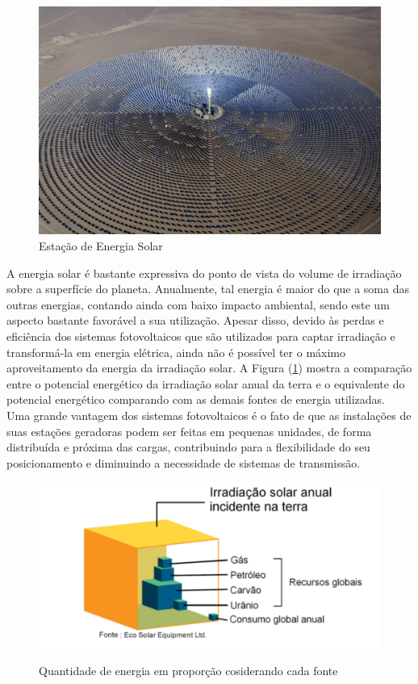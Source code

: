 \documentclass[11pt, a4paper, oneside]{article}
\begin{document}
\begin{figure}[h!]
\centering
\includegraphics[width=1\linewidth]{fonte_solar}
\caption{Estação de Energia Solar \cite{fonte_solar}}
\end{figure}

A energia solar é bastante expressiva do ponto de vista do volume de
irradiação sobre a superfície do planeta. Anualmente, tal energia é maior do que a
soma das outras energias, contando ainda com baixo impacto ambiental, sendo
este um aspecto bastante favorável a sua utilização. Apesar disso, devido às perdas
e eficiência dos sistemas fotovoltaicos que são utilizados para captar irradiação e
transformá-la em energia elétrica, ainda não é possível ter o máximo
aproveitamento da energia da irradiação solar. A Figura (\ref{energias_planeta}) mostra a comparação
entre o potencial energético da irradiação solar anual da terra e o equivalente do
potencial energético comparando com as demais fontes de energia utilizadas.\\
Uma grande vantagem dos sistemas fotovoltaicos é o fato de que as
instalações de suas estações geradoras podem ser feitas em pequenas unidades, de
forma distribuída e próxima das cargas, contribuindo para a flexibilidade do seu
posicionamento e diminuindo a necessidade de sistemas de transmissão.

\begin{figure}[h!]
\centering
\includegraphics[width=.6\linewidth]{irradiacao_cada_energia}
\label{energias_planeta}
\caption{Quantidade de energia em proporção cosiderando cada fonte \cite{mestrado_renan}}
\end{figure}
\end{document}
